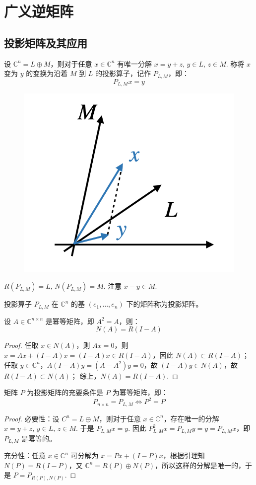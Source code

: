 \section{广义逆矩阵}

\subsection{投影矩阵及其应用}

\begin{definition}[投影算子]
设 $\mathbb C^n=L\oplus M$，则对于任意 $x\in\mathbb C^n$ 有唯一分解 $x=y+z,\,y\in L,\,z\in M$.  称将 $x$ 变为 $y$ 的变换为沿着 $M$ 到 $L$ 的投影算子，记作 $P_{L,M}$，即：
\[P_{L,M}x=y\]
\begin{figure}[H]
    \centering
    \includegraphics[width=0.2\linewidth]{figs/proj.png}
\end{figure}
\end{definition}

\begin{property}
$R(P_{L,M})=L,\,N(P_{L,M})=M$. 注意 $x-y\in M$.
\end{property}

\begin{definition}[投影矩阵]
投影算子 $P_{L,M}$ 在 $\mathbb C^n$ 的基 $(e_1,\ldots,e_n)$ 下的矩阵称为投影矩阵。
\end{definition}

\begin{lemma}
设 $A\in\mathbb C^{n\times n}$ 是幂等矩阵，即 $A^2=A$，则：
\[N(A)=R(I-A)\]
\end{lemma}
\begin{proof}
任取 $x\in N(A)$，则 $Ax=0$，则 $x=Ax+(I-A)x=(I-A)x\in R(I-A)$，因此 $N(A)\subset R(I-A)$；
任取 $y\in\mathbb C^n$，$A(I-A)y=(A-A^2)y=0$，故 $(I-A)y\in N(A)$，故 $R(I-A)\subset N(A)$；
综上，$N(A)=R(I-A)$.
\end{proof}

\begin{theorem}[投影与幂等]
矩阵 $P$ 为投影矩阵的充要条件是 $P$ 为幂等矩阵，即：
\[
    P_{n\times n}=P_{L,M}\iff P^2=P
\]
\end{theorem}
\begin{proof}
必要性：设 $C^n=L\oplus M$，则对于任意 $x\in\mathbb C^n$，存在唯一的分解 $x=y+z,\,y\in L,\,z\in M$.  于是 $P_{L,M}x=y$. 因此 $P_{L,M}^2x=P_{L,M}y=y=P_{L,M}x$，即 $P_{L,M}$ 是幂等的。

充分性：任意 $x\in\mathbb C^n$ 可分解为 $x=Px+(I-P)x$，根据引理知 $N(P)=R(I-P)$，又 $\mathbb C^n=R(P)\oplus N(P)$，所以这样的分解是唯一的，于是 $P=P_{R(P),N(P)}$.
\end{proof}

